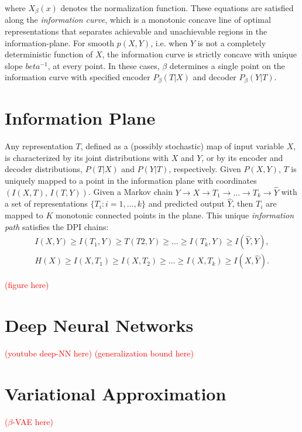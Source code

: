 \documentclass[11pt]{article}
\newcommand\myworries[1]{\textcolor{red}{(#1)}}
\begin{document}
where $X_\beta(x)$ denotes the normalization function. These equations are satisfied along the \textit{information curve}, which is a monotonic concave line of optimal representations that separates achievable and unachievable regions in the information-plane. For smooth $p(X,Y)$, i.e. when $Y$ is not a completely deterministic function of $X$, the information curve is strictly concave with unique slope $beta^{-1}$, at every point. In these cases, $\beta$ determines a single point on the information curve with specified encoder $P_\beta(T\vert X)$ and decoder $P_\beta(Y\vert T)$.

\section{Information Plane}

Any representation $T$, defined as a (possibly stochastic) map of input variable $X$, is characterized by its joint distributions with $X$ and $Y$, or by its encoder and decoder distributions, $P(T\vert X)$ and $P(Y\vert T)$, respectively. Given $P(X,Y)$, $T$ is uniquely mapped to a point in the information plane with coordinates $(I(X,T),\,I(T,Y))$. Given a Markov chain $Y\rightarrow X \rightarrow T_1 \rightarrow \ldots \rightarrow T_k \rightarrow \hat{Y}$ with a set of representations $\{T_i : i=1,\ldots,k\}$ and predicted output $\hat{Y}$, then $T_i$ are mapped to $K$ monotonic connected points in the plane. This unique \textit{information path} satisfies the DPI chains:
\begin{gather}
I(X,Y) \geq I(T_1,Y) \geq T(T2,Y) \geq \ldots \geq I(T_k, Y) \geq I(\hat{Y}, Y),\\
H(X) \geq I(X,T_1) \geq I(X,T_2) \geq \ldots \geq I(X,T_k) \geq I(X,\hat{Y}).
\end{gather}

\myworries{figure here}



\section{Deep Neural Networks}




\myworries{youtube deep-NN here}
\myworries{generalization bound here}

\section{Variational Approximation}


\myworries{$\beta$-VAE here}


 
\end{document}
